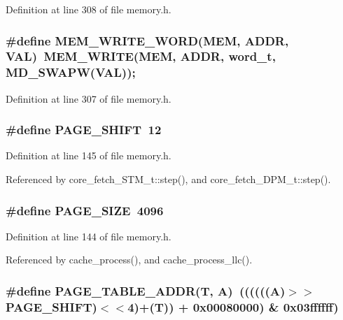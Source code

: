 Definition at line 308 of file memory.h.
\subsubsection[{MEM\_\-WRITE\_\-WORD}]{\setlength{\rightskip}{0pt plus 5cm}\#define MEM\_\-WRITE\_\-WORD(MEM, \/  ADDR, \/  VAL)~MEM\_\-WRITE(MEM, ADDR, {\bf word\_\-t}, MD\_\-SWAPW(VAL));}\label{memory_8h_f73ab32adca03428d5ff21ea43d9f473}




Definition at line 307 of file memory.h.
\subsubsection[{PAGE\_\-SHIFT}]{\setlength{\rightskip}{0pt plus 5cm}\#define PAGE\_\-SHIFT~12}\label{memory_8h_850d80ca2291d26b40dc6b25c419f81a}




Definition at line 145 of file memory.h.

Referenced by core\_\-fetch\_\-STM\_\-t::step(), and core\_\-fetch\_\-DPM\_\-t::step().
\subsubsection[{PAGE\_\-SIZE}]{\setlength{\rightskip}{0pt plus 5cm}\#define PAGE\_\-SIZE~4096}\label{memory_8h_7d467c1d283fdfa1f2081ba1e0d01b6e}




Definition at line 144 of file memory.h.

Referenced by cache\_\-process(), and cache\_\-process\_\-llc().
\subsubsection[{PAGE\_\-TABLE\_\-ADDR}]{\setlength{\rightskip}{0pt plus 5cm}\#define PAGE\_\-TABLE\_\-ADDR(T, \/  A)~((((((A)$>$$>$PAGE\_\-SHIFT)$<$$<$4)+(T)) + 0x00080000) \& 0x03ffffff)}\label{memory_8h_628a3729ebbf0306b93db41d9b34b0ca}




